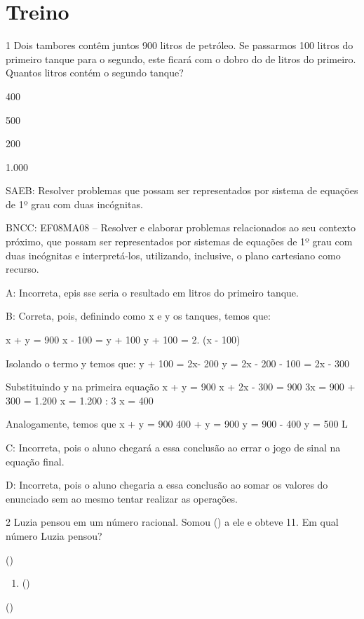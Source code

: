 {\section{Treino}

\num{1} Dois tambores contêm juntos 900 litros de petróleo. Se passarmos 100
litros do primeiro tanque para o segundo, este ficará com o dobro do de
litros do primeiro. Quantos litros contém o segundo tanque?
\item 400
\item 500
\item 200
\item 1.000

SAEB: Resolver problemas que possam ser representados por sistema de
equações de 1º grau com duas incógnitas.

BNCC: EF08MA08 -- Resolver e elaborar problemas relacionados ao seu
contexto próximo, que possam ser representados por sistemas de equações
de 1º grau com duas incógnitas e interpretá-los, utilizando, inclusive,
o plano cartesiano como recurso.

A: Incorreta, epis sse seria o resultado em litros do primeiro tanque.

B: Correta, pois, definindo como x e y os tanques, temos que:

x + y = 900 x - 100 = y + 100 y + 100 = 2. (x - 100)

Isolando o termo y temos que: y + 100 = 2x- 200 y = 2x - 200 - 100 = 2x
- 300

Substituindo y na primeira equação x + y = 900 x + 2x - 300 = 900 3x =
900 + 300 = 1.200 x = 1.200 : 3 x = 400

Analogamente, temos que x + y = 900 400 + y = 900 y = 900 - 400 y = 500
L

C: Incorreta, pois o aluno chegará a essa conclusão ao errar o jogo de
sinal na equação final.

D: Incorreta, pois o aluno chegaria a essa conclusão ao somar os valores
do enunciado sem ao mesmo tentar realizar as operações.

\num{2} Luzia pensou em um número racional. Somou () a ele e
obteve 11. Em qual número Luzia pensou?
\item ()

\begin{enumerate}
\def\labelenumi{\alph{enumi})}
\setcounter{enumi}{1}
\tightlist
\item
  ()
\end{enumerate}
\item ()

}
